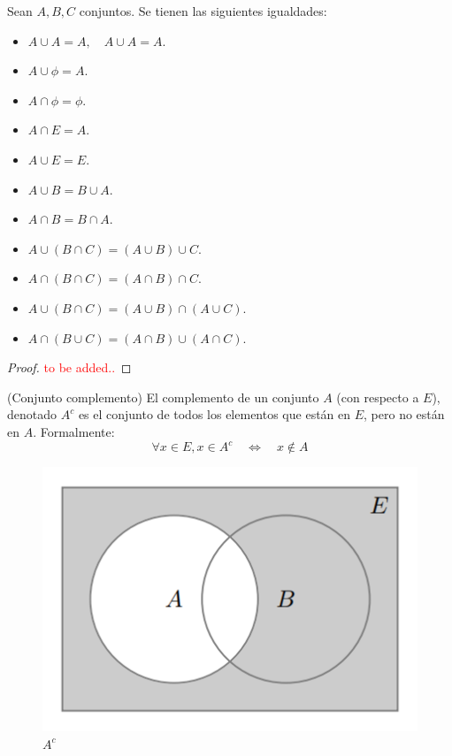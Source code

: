\begin{proposicion}
	Sean $A, B, C$ conjuntos. Se tienen las siguientes igualdades: 
	\begin{itemize}
		\item $A \cup A  = A, \quad A\cup A = A$. 
		\item $A \cup \phi = A$. 
		\item $A \cap \phi = \phi$. 
		\item $A \cap E = A$. 
		\item $A \cup E = E$. 
		\item $A \cup B = B \cup A$. 
		\item $A \cap B = B \cap A$. 
		\item $A \cup (B \cap C) = ( A \cup B ) \cup C$. 
		\item $A \cap (B \cap C) = (A \cap B) \cap C$. 
		\item $A \cup (B \cap C) = (A\cup B) \cap (A\cup C)$. 
		\item $A \cap (B \cup C) = (A \cap B) \cup (A \cap C)$.  
	\end{itemize}
\end{proposicion}


\begin{proof}
	\textcolor{red}{to be added..}
\end{proof}

\begin{definicion}{(Conjunto complemento)}
	El complemento de un conjunto $A$ (con respecto a $E$), denotado $A^c$ es el conjunto de todos los elementos que están en $E$, pero no están en $A$. Formalmente: 
	$$ \forall x \in E, x \in A^c \quad \iff \quad x \notin A $$ 
\end{definicion}

\begin{figure}[H]
	\begin{center}
		\includegraphics[scale=0.8]{figuras/capitulo1/02-conjuntos/complemento.png}
		\caption{$A^c$}
	\end{center}
\end{figure}

